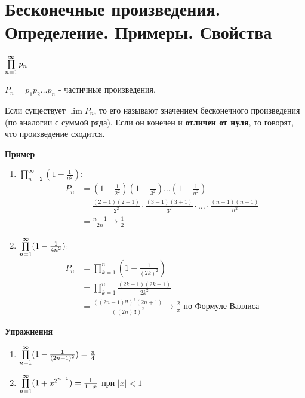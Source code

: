 \section{Бесконечные произведения. Определение. Примеры. Свойства }
\begin{conj}
    $\prod \limits_{n=1}^\infty p_n$

    $P_n = p_1p_2 \ldots p_n$ - частичные произведения.

    Если существует $\lim P_n$, то его называют значением бесконечного произведения (по аналогии с суммой ряда).
    Если он конечен и \textbf{отличен от нуля}, то говорят, что произведение сходится.
\end{conj}

\textbf{Пример}
\begin{enumerate}
    \item $\prod \limits_{n=2}^\infty (1 - \frac{1}{n^2})$:
    \begin{align*}
        P_n &= (1 - \frac{1}{2^2})(1-\frac{}{3^2})\ldots (1-\frac{1}{n^2}) \\
        &= \frac{(2-1)(2+1)}{2^2}
        \cdot \frac{(3-1)(3+1)}{3^2} 
        \cdot \ldots \cdot \frac{(n-1)(n+1)}{n^2} \\
        &= \frac{n+1}{2n} \longrightarrow \frac{1}{2}
    \end{align*}
    \item $\prod \limits_{n=1}^\infty (1 - \frac{1}{4n^2})$:
    \begin{align*}
        P_n &= \prod \limits_{k=1}^n (1 - \frac{1}{(2k)^2}) \\
        &= \prod \limits_{k=1}^n \frac{(2k-1)(2k+1)}{2k^2} \\
        &= \frac{((2n-1)!!)^2(2n+1)}{((2n)!!)^2} \longrightarrow \frac{2}{\pi} \text{ по Формуле Валлиса}
    \end{align*}
\end{enumerate}
\textbf{Упражнения}
\begin{enumerate}
    \item $\prod \limits_{n=1}^\infty (1 - \frac{1}{(2n+1)^2}) = \frac{\pi}{4}$
    \item $\prod \limits_{n=1}^\infty (1+x^{2^{n-1}}) = \frac{1}{1-x}$ при $|x| < 1$
\end{enumerate}

